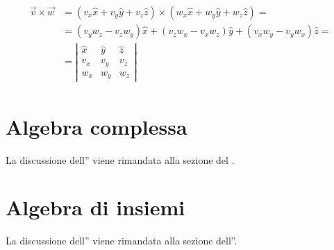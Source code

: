 \documentclass[letterpaper,10pt,italian]{jupyterBook}
\begin{document}
\begin{equation*}
\begin{split}\begin{aligned}
    \vec{v} \times \vec{w}
    & = (v_x \hat{x} + v_y \hat{y} + v_z \hat{z}) \times (w_x \hat{x} + w_y \hat{y} + w_z \hat{z}) = \\
    & = (v_y w_z - v_z w_y) \hat{x} + (v_z w_x - v_x w_z) \hat{y} + (v_x w_y - v_y w_x) \hat{z} = \\
    & = \left| \begin{matrix} \hat{x} & \hat{y} & \hat{z} \\ v_x & v_y & v_z \\ w_x & w_y & w_z  \end{matrix} \right|
  \end{aligned}\end{split}
\end{equation*}
\sphinxstepscope




\chapter{Algebra complessa}
\label{\detokenize{ch/algebra/complex-algebra-link:algebra-complessa}}\label{\detokenize{ch/algebra/complex-algebra-link:math-hs-algebra-complex-link}}\label{\detokenize{ch/algebra/complex-algebra-link::doc}}
\sphinxAtStartPar
La discussione dell”{\hyperref[\detokenize{ch/algebra/complex-algebra:math-hs-algebra-complex}]{}} viene rimandata alla sezione del {\hyperref[\detokenize{ch/precalculus:math-hs-precalculus}]{}}.

\sphinxstepscope




\chapter{Algebra di insiemi}
\label{\detokenize{ch/algebra/set-algebra-link:algebra-di-insiemi}}\label{\detokenize{ch/algebra/set-algebra-link:math-hs-algebra-set-link}}\label{\detokenize{ch/algebra/set-algebra-link::doc}}
\sphinxAtStartPar
La discussione dell”{\hyperref[\detokenize{ch/set:math-hs-set-algebra}]{}} viene rimandata alla sezione dell”{\hyperref[\detokenize{ch/set:math-hs-set}]{}}.
\end{document}
